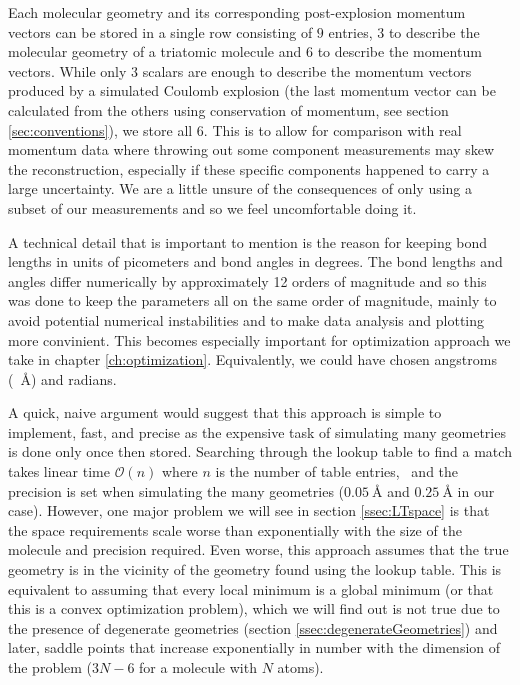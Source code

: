 Each molecular geometry and its corresponding post-explosion momentum vectors can be stored in a single row consisting of $9$ entries, $3$ to describe the molecular geometry of a triatomic molecule and $6$ to describe the momentum vectors. While only $3$ scalars are enough to describe the momentum vectors produced by a simulated Coulomb explosion (the last momentum vector can be calculated from the others using conservation of momentum, see section \ref{sec:conventions}), we store all $6$. This is to allow for comparison with real momentum data where throwing out some component measurements may skew the reconstruction, especially if these specific components happened to carry a large uncertainty. We are a little unsure of the consequences of only using a subset of our measurements and so we feel uncomfortable doing it. 

A technical detail that is important to mention is the reason for keeping bond lengths in units of picometers and bond angles in degrees. The bond lengths and angles differ numerically by approximately 12 orders of magnitude and so this was done to keep the parameters all on the same order of magnitude, mainly to avoid potential numerical instabilities and to make data analysis and plotting more convinient. This becomes especially important for optimization approach we take in chapter \ref{ch:optimization}. Equivalently, we could have chosen angstroms (\SI{}{\angstrom}) and radians.

A quick, naive argument would suggest that this approach is simple to implement, fast, and precise as the expensive task of simulating many geometries is done only once then stored. Searching through the lookup table to find a match takes linear time $\mathcal{O}(n)$ where $n$ is the number of table entries,\footnotemark~ and the precision is set when simulating the many geometries ($\SI{0.05}{\angstrom}$ and $\SI{0.25}{\angstrom}$ in our case). However, one major problem we will see in section \ref{ssec:LTspace} is that the space requirements scale worse than exponentially with the size of the molecule and precision required. Even worse, this approach assumes that the true geometry is in the vicinity of the geometry found using the lookup table. This is equivalent to assuming that every local minimum is a global minimum (or that this is a convex optimization problem), which we will find out is not true due to the presence of degenerate geometries (section \ref{ssec:degenerateGeometries}) and later, saddle points that increase exponentially in number with the dimension of the problem ($3N-6$ for a molecule with $N$ atoms).

